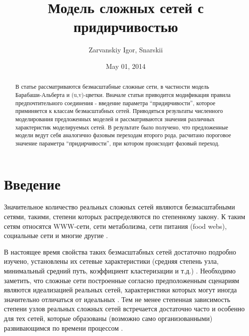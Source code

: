 \documentclass[10pt,aps,pra]{revtex4-1}
\begin{document}
\title{Модель сложных сетей с придирчивостью}
\author{Zarvanskiy Igor, Snarskii}


\date{May 01, 2014}

\begin{abstract}
В статье рассматриваются безмасштабные сложные сети, в частности модель Барабаши-Альберта и (u,v)-цветки. Вначале статьи приводится модификация правила предпочтительного соединения - введение параметра ``придирчивости'', которое приминяется к классам безмасштабных сетей. Приводяться результаты численного моделирования предложенных моделей и рассматриваются значения различных характеристик моделируемых сетей. В результате было получено, что предложенные модели ведут себя аналогично фазовым переходам второго рода, расчитано пороговое значение параметра ``придирчивости'', при котором происходит фазовый переход.
\end{abstract}

\maketitle

\linenumbers\par

\section{Введение}

Значительное количество реальных сложных сетей являются безмасштабными сетями, такими, степени которых распределяются по степенному закону. К таким сетям относятся WWW-сети, сети метаболизма, сети питания (food webs), социальные сети и многие другие \cite{Dor2}.

В настоящее время свойства таких безмасштабных сетей достаточно подробно изучено, установлены их сетевые характеристики (средняя степень узла, минимальный средний путь, коэффициент кластеризации и т.д.) \cite{Newman}. Необходимо заметить, что сложные сети построенные согласно предположенным сценариям \cite{AlBa2} являются идеализацией реальных сетей, характеристики которых могут иногда значительно отличаться от идеальных \cite{Newman}. Тем не менее степенная зависимость степени узлов реальных сложных сетей встречается достаточно часто и особенно для тех сетей, которые образованы (возможно само организованными) развивающимся по времени процессом \cite{}.
\end{document}
